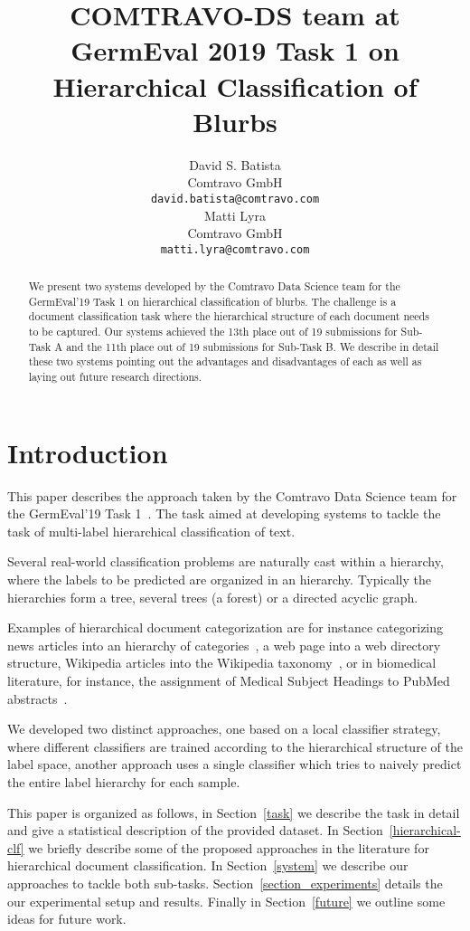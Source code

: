 \documentclass[11pt,a4paper]{article}
\title{COMTRAVO-DS team at GermEval 2019 Task 1 on Hierarchical Classification of Blurbs}
\author{David S. Batista \\
  Comtravo GmbH \\
  {\tt david.batista@comtravo.com} \\\And
  Matti Lyra \\
  Comtravo GmbH \\
  {\tt matti.lyra@comtravo.com} \\}
\date{}
\begin{document}
\maketitle

\begin{abstract}
We present two systems developed by the Comtravo Data Science team for the GermEval'19 Task 1
on hierarchical classification of blurbs. The challenge is a document classification
task where the hierarchical structure of each document needs to be captured. Our
systems achieved the 13th place out of 19 submissions for Sub-Task A and the 11th
place out of 19 submissions for Sub-Task B. We describe in detail these two
systems pointing out the advantages and disadvantages of each as well as laying
out future research directions.
\end{abstract}




\section{Introduction}

This paper describes the approach taken by the Comtravo Data Science team
for the GermEval'19 Task 1~\cite{Remus:2019}. The task aimed at developing systems
to tackle the task of multi-label hierarchical classification of text.

Several real-world classification problems are naturally cast within a hierarchy,
where the labels to be predicted are organized in an hierarchy. Typically the
hierarchies form a tree, several trees (a forest) or a directed acyclic graph.

Examples of hierarchical document categorization are for instance categorizing
news articles into an hierarchy of categories~\cite{Lewis:2004:RNB:1005332.1005345},
a web page into a web directory structure, Wikipedia articles into the
Wikipedia taxonomy~\cite{PartalasKBAPGAA15}, or in biomedical literature, for
instance, the assignment of Medical Subject Headings to PubMed
abstracts~\cite{lipscomb2000medical}.

We developed two distinct approaches, one based on a local classifier strategy,
where different classifiers are trained according to the hierarchical structure of
the label space, another approach uses a single classifier which tries to naively
predict the entire label hierarchy for each sample.

This paper is organized as follows, in Section~\ref{task} we describe the task in
detail and give a statistical description of the provided dataset. In
Section~\ref{hierarchical-clf} we briefly describe some of the proposed approaches in
the literature for hierarchical document classification. In Section~\ref{system}
we describe our approaches to tackle both sub-tasks. Section~\ref{section_experiments}
details the our experimental setup and results. Finally in Section~\ref{future} we
outline some ideas for future work.
\end{document}
